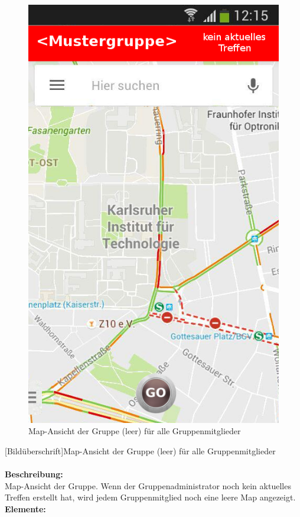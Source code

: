 \begin{figure} [H]
	\caption{Map-Ansicht der Gruppe (leer) für alle Gruppenmitglieder}
	\includegraphics[scale =0.5]{resources/images/map_leer.png}
\end{figure}
[Bildüberschrift]Map-Ansicht der Gruppe (leer) für alle Gruppenmitglieder\\ \\
\textbf{Beschreibung:}\\
Map-Ansicht der Gruppe. Wenn der Gruppenadministrator noch kein aktuelles Treffen erstellt hat, wird jedem Gruppenmitglied noch eine leere Map angezeigt.\\
\textbf{Elemente:}\\
